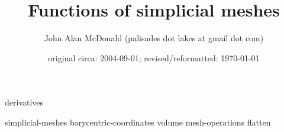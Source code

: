 \documentclass{PalisadesLakesReport}
\title{Functions of simplicial meshes}
\author{John Alan McDonald (palisades dot lakes at gmail dot com)}
\date{original circa: 2004-09-01; revised/reformatted: \today}
\begin{document}
\maketitle
\PalisadesLakesTableOfContents
\def\sharedFolder{../../shared/}





{derivatives}


{simplicial-meshes}
{barycentric-coordinates}
{volume}
{mesh-operations}
{flatten}



\end{document}
